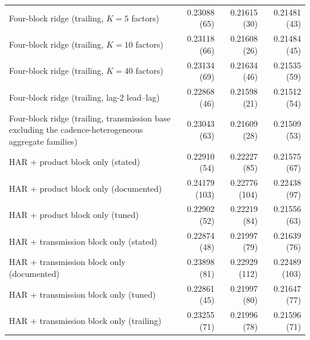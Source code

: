 \begin{longtable}{p{}rrr}
Four-block ridge (trailing, $K=5$ factors) & 0.23088 (65) & 0.21615 (30) & 0.21481 (43) \\
Four-block ridge (trailing, $K=10$ factors) & 0.23118 (66) & 0.21608 (26) & 0.21484 (45) \\
Four-block ridge (trailing, $K=40$ factors) & 0.23134 (69) & 0.21634 (46) & 0.21535 (59) \\
Four-block ridge (trailing, lag-2 lead--lag) & 0.22868 (46) & 0.21598 (21) & 0.21512 (54) \\
Four-block ridge (trailing, transmission base excluding the cadence-heterogeneous aggregate families) & 0.23043 (63) & 0.21609 (28) & 0.21509 (53) \\
HAR + product block only (stated) & 0.22910 (54) & 0.22227 (85) & 0.21575 (67) \\
HAR + product block only (documented) & 0.24179 (103) & 0.22776 (104) & 0.22438 (97) \\
HAR + product block only (tuned) & 0.22902 (52) & 0.22219 (84) & 0.21556 (63) \\
HAR + transmission block only (stated) & 0.22874 (48) & 0.21997 (79) & 0.21639 (76) \\
HAR + transmission block only (documented) & 0.23898 (81) & 0.22929 (112) & 0.22489 (103) \\
HAR + transmission block only (tuned) & 0.22861 (45) & 0.21997 (80) & 0.21647 (77) \\
HAR + transmission block only (trailing) & 0.23255 (71) & 0.21996 (78) & 0.21596 (71) \\
\end{longtable}
\endgroup
